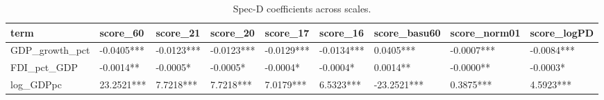 \begin{table}

\caption{\label{tab:tab:alt_scales_coefs}Spec-D coefficients across scales.}
\centering
\begin{tabular}[t]{lllllllll}
\toprule
term & score\_60 & score\_21 & score\_20 & score\_17 & score\_16 & score\_basu60 & score\_norm01 & score\_logPD\\
\midrule
GDP\_growth\_pct & -0.0405*** & -0.0123*** & -0.0123*** & -0.0129*** & -0.0134*** & 0.0405*** & -0.0007*** & -0.0084***\\
FDI\_pct\_GDP & -0.0014** & -0.0005* & -0.0005* & -0.0004* & -0.0004* & 0.0014** & -0.0000** & -0.0003*\\
log\_GDPpc & 23.2521*** & 7.7218*** & 7.7218*** & 7.0179*** & 6.5323*** & -23.2521*** & 0.3875*** & 4.5923***\\
\bottomrule
\end{tabular}
\end{table}
